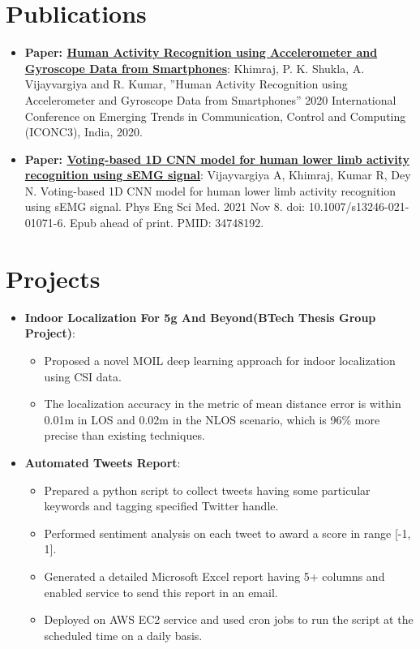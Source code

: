 \documentclass[a4paper,20pt]{article}
\newcommand{\resumeItem}[2]{
  \item\small{
    \textbf{#1}{: #2 \vspace{-2pt}}
  }
}
\newcommand{\resumeSubItem}[2]{\resumeItem{#1}{#2}\vspace{-3pt}}
\newcommand{\resumeSubHeadingListStart}{\begin{itemize}[leftmargin=*]}
\newcommand{\resumeSubHeadingListEnd}{\end{itemize}}
\begin{document}
\vspace{-3pt}
\section{Publications}
\resumeSubHeadingListStart
\resumeSubItem{Paper: \href{https://ieeexplore.ieee.org/document/9117456}{Human Activity Recognition using Accelerometer and Gyroscope Data from Smartphones}}{Khimraj, P. K. Shukla, A. Vijayvargiya and R. Kumar, ”Human Activity Recognition using Accelerometer and Gyroscope Data from Smartphones” 2020 International Conference on Emerging Trends in Communication, Control and Computing (ICONC3), India, 2020.}
\vspace{2pt}
\resumeSubItem{Paper: \href{https://link.springer.com/article/10.1007/s13246-021-01071-6}{Voting-based 1D CNN model for human lower limb activity recognition using sEMG signal}}{Vijayvargiya A, Khimraj, Kumar R, Dey N. Voting-based 1D CNN model for human lower limb activity recognition using sEMG signal. Phys Eng Sci Med. 2021 Nov 8. doi: 10.1007/s13246-021-01071-6. Epub ahead of print. PMID: 34748192.}
\resumeSubHeadingListEnd


\vspace{-3pt}
\section{Projects}
\resumeSubHeadingListStart
\resumeSubItem{Indoor Localization For 5g And Beyond(BTech Thesis Group Project)}{}
\vspace{-2pt}
\begin{itemize}[label=$\circ$]
\item Proposed a novel MOIL deep learning approach for indoor localization using CSI data.
\vspace{-3pt}
\item The localization accuracy in the metric of mean distance error is within 0.01m in LOS and 0.02m in the NLOS scenario, which is 96\% more precise than existing techniques.
\end{itemize}
\vspace{-8pt}
\resumeSubItem{Automated Tweets Report}{}
\vspace{-2pt}
\begin{itemize}[label=$\circ$]
\item Prepared a python script to collect tweets having some particular keywords and tagging speciﬁed Twitter handle.
\vspace{-3pt}
\item Performed sentiment analysis on each tweet to award a score in range [-1, 1].
\vspace{-3pt}
\item Generated a detailed Microsoft Excel report having 5+ columns and enabled service to send this report in an email.
\vspace{-3pt}
\item Deployed on AWS EC2 service and used cron jobs to run the script at the scheduled time on a daily basis.
\end{itemize}
\vspace{-2pt}
\resumeSubHeadingListEnd
\end{document}
